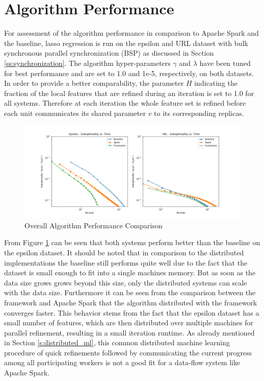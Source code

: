 \section{Algorithm Performance}
For assessment of the algorithm performance in comparison to Apache Spark and the baseline, lasso regression is run on the epsilon and URL dataset with bulk synchronous parallel synchronization (BSP) as discussed in Section \ref{ss:synchronization}.
The algorithm hyper-parameters $\gamma$ and $\lambda$ have been tuned for best performance and are set to 1.0 and 1e-5, respectively, on both datasets.
In order to provide a better comparability, the parameter $H$ indicating the fraction of the local features that are refined during an iteration is set to 1.0 for all systems.
Therefore at each iteration the whole feature set is refined before each unit communicates its shared parameter $v$ to its corresponding replicas. 
\begin{figure}[ht]
\centering
\includegraphics[width=1.0\textwidth]{img/overall_perf_cmp.png}
\caption{Overall Algorithm Performance Comparison}
\label{fig:algo_perf_cmp}
\end{figure}
From Figure \ref{fig:algo_perf_cmp} can be seen that both systems perform better than the baseline on the epsilon dataset.
It should be noted that in comparison to the distributed implementations the baseline still performs quite well due to the fact that the dataset is small enough to fit into a single machines memory.
But as soon as the data size grows grows beyond this size, only the distributed systems can scale with the data size.
Furthermore it can be seen from the comparison between the framework and Apache Spark that the algorithm distributed with the framework converges faster.
This behavior stems from the fact that the epsilon dataset has a small number of features, which are then distributed over multiple machines for parallel refinement, resulting in a small iteration runtime.
As already mentioned in Section \ref{s:distributed_ml}, this common distributed machine learning procedure of quick refinements followed by communicating the current progress among all participating workers is not a good fit for a data-flow system like Apache Spark.

